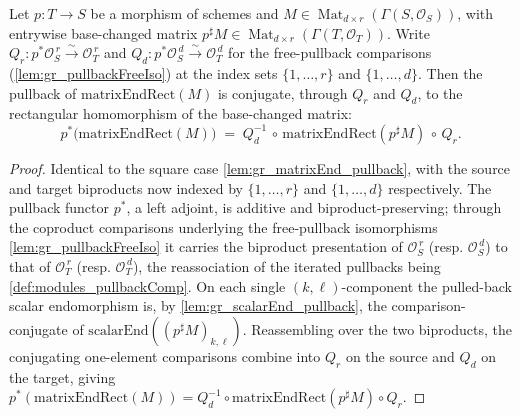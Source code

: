 \begin{lemma}\leanok
  \label{lem:gr_matrixEndRect_pullback}
  Let \(p : T \to S\) be a morphism of schemes and
  \(M \in \operatorname{Mat}_{d\times r}(\Gamma(S,\mathcal{O}_S))\), with entrywise
  base-changed matrix \(p^{\sharp}M \in \operatorname{Mat}_{d\times r}(\Gamma(T,\mathcal{O}_T))\).
  Write \(Q_r : p^{*}\mathcal{O}_S^{\,r} \xrightarrow{\sim} \mathcal{O}_T^{\,r}\) and
  \(Q_d : p^{*}\mathcal{O}_S^{\,d} \xrightarrow{\sim} \mathcal{O}_T^{\,d}\) for the
  free-pullback comparisons (\cref{lem:gr_pullbackFreeIso}) at the index sets
  \(\{1,\dots,r\}\) and \(\{1,\dots,d\}\). Then the pullback of
  \(\mathrm{matrixEndRect}(M)\) is conjugate, through \(Q_r\) and \(Q_d\), to the
  rectangular homomorphism of the base-changed matrix:
  \[
    p^{*}\bigl(\mathrm{matrixEndRect}(M)\bigr)
      \;=\; Q_d^{-1} \,\circ\, \mathrm{matrixEndRect}(p^{\sharp}M) \,\circ\, Q_r .
  \]
\end{lemma}
\begin{proof}
  Identical to the square case \cref{lem:gr_matrixEnd_pullback}, with the source and target
  biproducts now indexed by \(\{1,\dots,r\}\) and \(\{1,\dots,d\}\) respectively. The
  pullback functor \(p^{*}\), a left adjoint, is additive and biproduct-preserving; through
  the coproduct comparisons underlying the free-pullback isomorphisms
  \cref{lem:gr_pullbackFreeIso} it carries the biproduct presentation of
  \(\mathcal{O}_S^{\,r}\) (resp. \(\mathcal{O}_S^{\,d}\)) to that of \(\mathcal{O}_T^{\,r}\)
  (resp. \(\mathcal{O}_T^{\,d}\)), the reassociation of the iterated pullbacks being
  \cref{def:modules_pullbackComp}. On each single \((k,\ell)\)-component the pulled-back
  scalar endomorphism is, by \cref{lem:gr_scalarEnd_pullback}, the comparison-conjugate of
  \(\mathrm{scalarEnd}((p^{\sharp}M)_{k,\ell})\). Reassembling over the two biproducts, the
  conjugating one-element comparisons combine into \(Q_r\) on the source and \(Q_d\) on the
  target, giving \(p^{*}(\mathrm{matrixEndRect}(M)) = Q_d^{-1}\circ
  \mathrm{matrixEndRect}(p^{\sharp}M)\circ Q_r\).
\end{proof}

